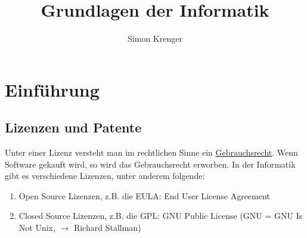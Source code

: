 \documentclass{report}
\title{Grundlagen der Informatik}
\author{Simon Krenger}
\begin{document}
\maketitle
\chapter{Einführung}
\section{Lizenzen und Patente}
Unter einer Lizenz versteht man im rechtlichen Sinne ein \underline{Gebrauchsrecht}. Wenn Software gekauft wird, so wird das Gebrauchsrecht erworben. In der Informatik gibt es verschiedene Lizenzen, unter anderem folgende:
\begin{enumerate}
\item Open Source Lizenzen, z.B. die EULA: End User License Agreement
\item Closed Source Lizenzen, z.B. die GPL: GNU Public License (GNU = GNU Is Not Unix, $\to$ Richard Stallman)
\end{enumerate}
\end{document}
